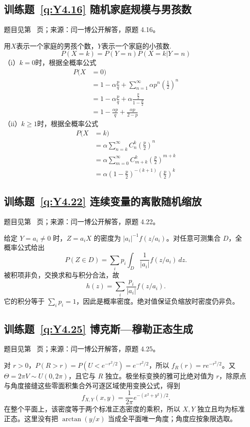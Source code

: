 \documentclass[UTF8,12pt,a4paper,fontset=fandol]{ctexbook}
\begin{document}
\subsection*{训练题~\ref{q:Y4.16} 随机家庭规模与男孩数}\label{a:Y4.16}{\small 题目见第~\pageref{q:Y4.16} 页；来源：闫一博公开解答，原题 4.16。}
\begin{solve}
用$X$表示一个家庭的男孩个数，$Y$表示一个家庭的小孩数.    
\[P(X = k) = P(Y = n)P(X = k|Y = n)\]
    （i）$k=0$时，根据全概率公式
    \[\begin{aligned}P(X &= 0) \\&= 1 - \alpha \frac{p}{q} + {\sum\limits_{n = 1}^\infty  {\alpha {p^n}\left( {\frac{1}{2}} \right)} ^n} \\&= 1 - \alpha \frac{p}{q} + \alpha \frac{{\frac{p}{2}}}{{1 - \frac{p}{2}}} \\&= 1 - \frac{{\alpha p}}{q} + \frac{{\alpha p}}{{2 - p}}\end{aligned}\]
    （ii）$k\geqslant 1$时，根据全概率公式
    \[\begin{aligned}P(X &= k) \\&= \alpha {\sum\limits_{n = k}^\infty  {C_n^k\left( {\frac{p}{2}} \right)} ^n} \\&= \alpha {\sum\limits_{m = 0}^\infty  {C_{m + k}^k\left( {\frac{p}{2}} \right)} ^{m + k}} \\&= \alpha {\left( {1 - \frac{p}{2}} \right)^{ - (k + 1)}}{\left( {\frac{p}{2}} \right)^k}\end{aligned}\]
\end{solve}

\subsection*{训练题~\ref{q:Y4.22} 连续变量的离散随机缩放}\label{a:Y4.22}{\small 题目见第~\pageref{q:Y4.22} 页；来源：闫一博公开解答，原题 4.22。}
\begin{solve}给定 $Y=a_i\ne0$ 时，$Z=a_iX$ 的密度为 $|a_i|^{-1}f(z/a_i)$。对任意可测集合 $D$，全概率公式给出\[P(Z\in D)=\sum_i p_i\int_D\frac1{|a_i|}f(z/a_i)\,dz.\]被积项非负，交换求和与积分合法，故\[h(z)=\sum_i\frac{p_i}{|a_i|}f(z/a_i).\]它的积分等于 $\sum_i p_i=1$，因此是概率密度。绝对值保证负缩放时密度仍非负。\end{solve}

\subsection*{训练题~\ref{q:Y4.25} 博克斯—穆勒正态生成}\label{a:Y4.25}{\small 题目见第~\pageref{q:Y4.25} 页；来源：闫一博公开解答，原题 4.25。}
\begin{solve}对 $r>0$，$P(R>r)=P(U<e^{-r^2/2})=e^{-r^2/2}$，所以 $f_R(r)=re^{-r^2/2}$。又 $\Theta=2\pi V\sim U(0,2\pi)$，且它与 $R$ 独立。极坐标变换的雅可比绝对值为 $r$，除原点与角度接缝这些零面积集合外可逐区域使用变换公式，得到\[f_{X,Y}(x,y)=\frac1{2\pi}e^{-(x^2+y^2)/2}.\]在整个平面上，该密度等于两个标准正态密度的乘积，所以 $X,Y$ 独立且均为标准正态。这里没有把 $\arctan(y/x)$ 当成全平面唯一角度；角度应按象限选取。\end{solve}
\end{document}
